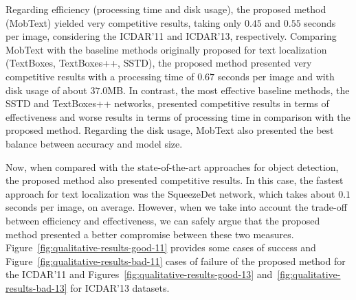 Regarding efficiency (processing time and disk usage), the proposed method (MobText) yielded very competitive results, taking only $0.45$ and $0.55$ seconds per image, considering the ICDAR'11 and ICDAR'13, respectively. Comparing MobText with the baseline methods originally proposed for text localization (TextBoxes, TextBoxes++, SSTD), the proposed method presented very competitive results with a processing time of $0.67$ seconds per image and with disk usage of about $37.0$MB. In contrast, the most effective baseline methods, the SSTD and TextBoxes++ networks, presented competitive results in terms of effectiveness and worse results in terms of processing time in comparison with the proposed method. Regarding the disk usage, MobText also presented the best balance between accuracy and model size.   

Now, when compared with the state-of-the-art approaches for object detection, the proposed method also presented competitive results. In this case, the fastest approach for text localization was the SqueezeDet network, which takes about $0.1$ seconds per image, on average. However, when we take into account the trade-off between efficiency and effectiveness, we can safely argue that the proposed method presented a better compromise between these two measures. Figure~\ref{fig:qualitative-results-good-11} provides some cases of success and Figure~\ref{fig:qualitative-results-bad-11} cases of failure of the proposed method for the ICDAR'11 and Figures~\ref{fig:qualitative-results-good-13} and~\ref{fig:qualitative-results-bad-13} for ICDAR'13 datasets. 


